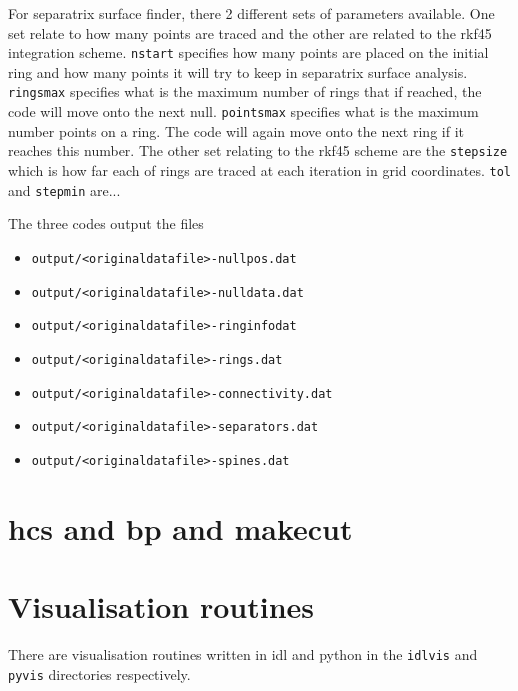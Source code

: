 \documentclass[12pt]{article}
\begin{document}
    For separatrix surface finder, there 2 different sets of parameters available. One set relate to how many points are traced and the other are related to the rkf45 integration scheme. \texttt{nstart} specifies how many points are placed on the initial ring and how many points it will try to keep in separatrix surface analysis. \texttt{ringsmax} specifies what is the maximum number of rings that if reached, the code will move onto the next null. \texttt{pointsmax} specifies what is the maximum number points on a ring. The code will again move onto the next ring if it reaches this number. The other set relating to the rkf45 scheme are the \texttt{stepsize} which is how far each of rings are traced at each iteration in grid coordinates. \texttt{tol} and \texttt{stepmin} are...
  
    The three codes output the files 
    \begin{itemize}
      \item \texttt{output/<originaldatafile>-nullpos.dat}
      \item \texttt{output/<originaldatafile>-nulldata.dat}
      \item \texttt{output/<originaldatafile>-ringinfodat}
      \item \texttt{output/<originaldatafile>-rings.dat}
      \item \texttt{output/<originaldatafile>-connectivity.dat}
      \item \texttt{output/<originaldatafile>-separators.dat}
      \item \texttt{output/<originaldatafile>-spines.dat}
    \end{itemize}

  \section{hcs and bp and makecut}

  \section{Visualisation routines}

    There are visualisation routines written in idl and python in the \texttt{idlvis} and \texttt{pyvis} directories respectively.
\end{document}
